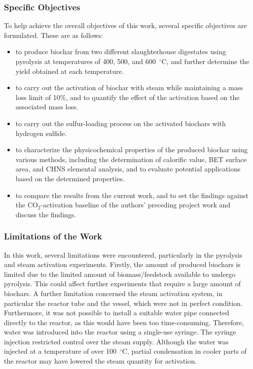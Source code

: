 \subsubsection{Specific Objectives}

To help achieve the overall objectives of this work, several specific objectives are formulated. These are as follows:

\begin{itemize}
    \item to produce biochar from two different slaughterhouse digestates using pyrolysis at temperatures of 400, 500, and 600~$^\circ$C, and further determine the yield obtained at each temperature. 
    \item to carry out the activation of biochar with steam while maintaining a mass loss limit of 10\%, and to quantify the effect of the activation based on the associated mass loss.
    \item to carry out the sulfur-loading process on the activated biochars with hydrogen sulfide.
    \item to characterize the physicochemical properties of the produced biochar using various methods, including the determination of calorific value, BET surface area, and CHNS elemental analysis, and to evaluate potential applications based on the determined properties.  
    \item to compare the results from the current work, and to set the findings against the CO$_2$-activation baseline of the authors’ preceding project work and discuss the findings.
\end{itemize}

\subsubsection{Limitations of the Work}
\label{subsec:limitations}
In this work, several limitations were encountered, particularly in the pyrolysis and steam activation experiments. Firstly, the amount of produced biochars is limited due to the limited amount of biomass/feedstock available to undergo pyrolysis. This could affect further experiments that require a large amount of biochars. A further limitation concerned the steam activation system, in particular the reactor tube and the vessel, which were not in perfect condition. Furthermore, it was not possible to install a suitable water pipe connected directly to the reactor, as this would have been too time-consuming. Therefore, water was introduced into the reactor using a single-use syringe. The syringe injection restricted control over the steam supply. Although the water was injected at a temperature of over 100~$^\circ$C, partial condensation in cooler parts of the reactor may have lowered the steam quantity for activation.

